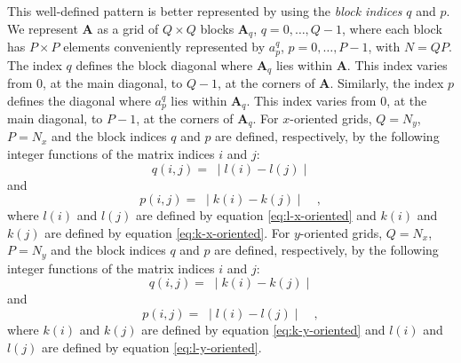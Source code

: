 \documentclass[manuscript,revised]{geophysics}
\begin{document}
This well-defined pattern is better represented by using the \textit{block indices} $q$ and $p$. 
We represent $\mathbf{A}$ as a grid of $Q \times Q$ blocks 
$\mathbf{A}_{q}$, $q = 0, \dots, Q - 1$, where each block has $P \times P$ elements 
conveniently represented by $a^{q}_{p}$, $p = 0, \dots, P - 1$, with $N = QP$. 
The index $q$ defines the block diagonal where $\mathbf{A}_{q}$ lies 
within $\mathbf{A}$. This index varies from $0$, at the main diagonal, to $Q - 1$, at
the corners of $\mathbf{A}$. Similarly, the index $p$ defines the diagonal where $a^{q}_{p}$ 
lies within $\mathbf{A}_{q}$. This index varies from $0$, at the main diagonal, to $P - 1$, at
the corners of $\mathbf{A}_{q}$.
For $x$-oriented grids, $Q = N_{y}$, $P = N_{x}$ and the block indices
$q$ and $p$ are defined, respectively, by the following integer functions 
of the matrix indices $i$ and $j$:
\begin{equation}
q(i, j) = \; \mid l(i) - l(j) \mid
\label{eq:q-x-oriented}
\end{equation}
and
\begin{equation}
p(i, j) = \; \mid k(i) - k(j) \mid \quad ,
\label{eq:p-x-oriented}
\end{equation}
where $l(i)$ and $l(j)$ are defined by equation \ref{eq:l-x-oriented} 
and $k(i)$ and $k(j)$ are defined by equation \ref{eq:k-x-oriented}.
For $y$-oriented grids, $Q = N_{x}$, $P = N_{y}$ and the block indices
$q$ and $p$ are defined, respectively, by the following integer functions 
of the matrix indices $i$ and $j$:
\begin{equation}
q(i, j) = \; \mid k(i) - k(j) \mid 
\label{eq:q-y-oriented}
\end{equation}
and
\begin{equation}
p(i, j) = \; \mid l(i) - l(j) \mid \quad ,
\label{eq:p-y-oriented}
\end{equation}
where $k(i)$ and $k(j)$ are defined by equation \ref{eq:k-y-oriented}
and $l(i)$ and $l(j)$ are defined by equation \ref{eq:l-y-oriented}.
\end{document}
